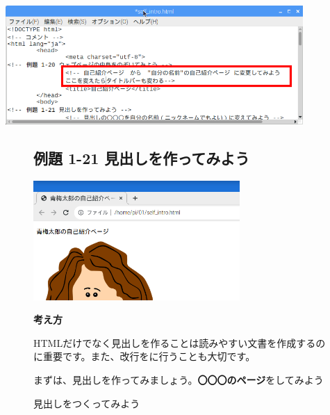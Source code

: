 \centering
\includegraphics[width=0.85\textwidth]{text01-img/textbook-img150.png}


\vfill
\clearpage


\begin{figure}[ht]
  \subsection{例題 1-21 見出しを作ってみよう}


  \centering
  \begin{minipage}{\textwidth}
    \includegraphics[width=0.7\textwidth]{text01-img/textbook-img153.png}
    \caption{見出しをつくってみよう}
  \end{minipage}


  \bigskip
  \flushleft

  \textbf{考え方}



  \begin{minipage}{\textwidth}
    \flushleft

    HTMLだけでなく見出しを作ることは読みやすい文書を作成するのに重要です。また、改行をに行うことも大切です。

    まずは、見出しを作ってみましょう。\textbf{〇〇〇のページ}をしてみよう


    \bigskip


\end{minipage}
\end{figure}
